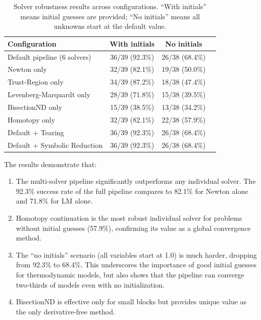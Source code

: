 \documentclass[review,3p]{elsarticle}
\begin{document}
\begin{table}[htbp]
\centering
\caption{Solver robustness results across configurations. ``With initials'' means initial guesses are provided; ``No initials'' means all unknowns start at the default value.}
\label{tab:robustness}
\begin{tabular}{@{}lccc@{}}
\toprule
\textbf{Configuration} & \textbf{With initials} & \textbf{No initials} \\
\midrule
Default pipeline (6 solvers) & 36/39 (92.3\%) & 26/38 (68.4\%) \\
Newton only                   & 32/39 (82.1\%) & 19/38 (50.0\%) \\
Trust-Region only             & 34/39 (87.2\%) & 18/38 (47.4\%) \\
Levenberg-Marquardt only      & 28/39 (71.8\%) & 15/38 (39.5\%) \\
BisectionND only              & 15/39 (38.5\%) & 13/38 (34.2\%) \\
Homotopy only                 & 32/39 (82.1\%) & 22/38 (57.9\%) \\
Default + Tearing             & 36/39 (92.3\%) & 26/38 (68.4\%) \\
Default + Symbolic Reduction  & 36/39 (92.3\%) & 26/38 (68.4\%) \\
\bottomrule
\end{tabular}
\end{table}

The results demonstrate that:
\begin{enumerate}
    \item The multi-solver pipeline significantly outperforms any individual solver. The 92.3\% success rate of the full pipeline compares to 82.1\% for Newton alone and 71.8\% for LM alone.
    \item Homotopy continuation is the most robust individual solver for problems without initial guesses (57.9\%), confirming its value as a global convergence method.
    \item The ``no initials'' scenario (all variables start at 1.0) is much harder, dropping from 92.3\% to 68.4\%. This underscores the importance of good initial guesses for thermodynamic models, but also shows that the pipeline can converge two-thirds of models even with no initialization.
    \item BisectionND is effective only for small blocks but provides unique value as the only derivative-free method.
\end{enumerate}
\end{document}
